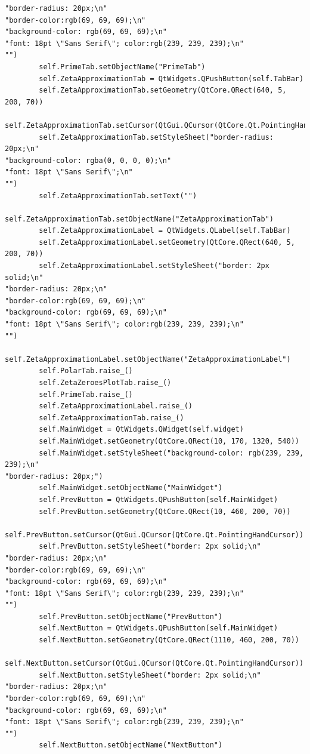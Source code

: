 \documentclass{article}
\begin{document}
\begin{lstlisting}
"border-radius: 20px;\n"
"border-color:rgb(69, 69, 69);\n"
"background-color: rgb(69, 69, 69);\n"
"font: 18pt \"Sans Serif\"; color:rgb(239, 239, 239);\n"
"")
        self.PrimeTab.setObjectName("PrimeTab")
        self.ZetaApproximationTab = QtWidgets.QPushButton(self.TabBar)
        self.ZetaApproximationTab.setGeometry(QtCore.QRect(640, 5, 200, 70))
        self.ZetaApproximationTab.setCursor(QtGui.QCursor(QtCore.Qt.PointingHandCursor))
        self.ZetaApproximationTab.setStyleSheet("border-radius: 20px;\n"
"background-color: rgba(0, 0, 0, 0);\n"
"font: 18pt \"Sans Serif\";\n"
"")
        self.ZetaApproximationTab.setText("")
        self.ZetaApproximationTab.setObjectName("ZetaApproximationTab")
        self.ZetaApproximationLabel = QtWidgets.QLabel(self.TabBar)
        self.ZetaApproximationLabel.setGeometry(QtCore.QRect(640, 5, 200, 70))
        self.ZetaApproximationLabel.setStyleSheet("border: 2px solid;\n"
"border-radius: 20px;\n"
"border-color:rgb(69, 69, 69);\n"
"background-color: rgb(69, 69, 69);\n"
"font: 18pt \"Sans Serif\"; color:rgb(239, 239, 239);\n"
"")
        self.ZetaApproximationLabel.setObjectName("ZetaApproximationLabel")
        self.PolarTab.raise_()
        self.ZetaZeroesPlotTab.raise_()
        self.PrimeTab.raise_()
        self.ZetaApproximationLabel.raise_()
        self.ZetaApproximationTab.raise_()
        self.MainWidget = QtWidgets.QWidget(self.widget)
        self.MainWidget.setGeometry(QtCore.QRect(10, 170, 1320, 540))
        self.MainWidget.setStyleSheet("background-color: rgb(239, 239, 239);\n"
"border-radius: 20px;")
        self.MainWidget.setObjectName("MainWidget")
        self.PrevButton = QtWidgets.QPushButton(self.MainWidget)
        self.PrevButton.setGeometry(QtCore.QRect(10, 460, 200, 70))
        self.PrevButton.setCursor(QtGui.QCursor(QtCore.Qt.PointingHandCursor))
        self.PrevButton.setStyleSheet("border: 2px solid;\n"
"border-radius: 20px;\n"
"border-color:rgb(69, 69, 69);\n"
"background-color: rgb(69, 69, 69);\n"
"font: 18pt \"Sans Serif\"; color:rgb(239, 239, 239);\n"
"")
        self.PrevButton.setObjectName("PrevButton")
        self.NextButton = QtWidgets.QPushButton(self.MainWidget)
        self.NextButton.setGeometry(QtCore.QRect(1110, 460, 200, 70))
        self.NextButton.setCursor(QtGui.QCursor(QtCore.Qt.PointingHandCursor))
        self.NextButton.setStyleSheet("border: 2px solid;\n"
"border-radius: 20px;\n"
"border-color:rgb(69, 69, 69);\n"
"background-color: rgb(69, 69, 69);\n"
"font: 18pt \"Sans Serif\"; color:rgb(239, 239, 239);\n"
"")
        self.NextButton.setObjectName("NextButton")

\end{lstlisting}
\end{document}
